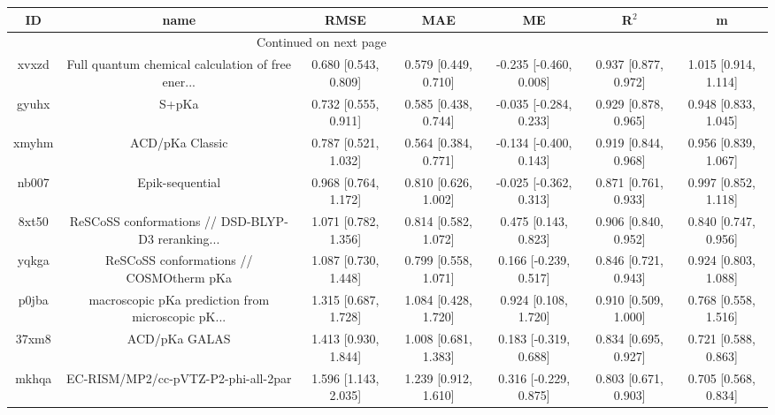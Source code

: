 \documentclass{article}
\begin{document}
\begin{center}
\begin{longtable}{|ccccccc|}
\toprule
    ID &                                               name &                  RMSE &                   MAE &                       ME &                 R$^2$ &                      m \\
\midrule
\endhead
\midrule
\multicolumn{3}{r}{{Continued on next page}} \\
\midrule
\endfoot

\bottomrule
\endlastfoot
 xvxzd &  Full quantum chemical calculation of free ener... &  0.680 [0.543, 0.809] &  0.579 [0.449, 0.710] &   -0.235 [-0.460, 0.008] &  0.937 [0.877, 0.972] &   1.015 [0.914, 1.114] \\
 gyuhx &                                              S+pKa &  0.732 [0.555, 0.911] &  0.585 [0.438, 0.744] &   -0.035 [-0.284, 0.233] &  0.929 [0.878, 0.965] &   0.948 [0.833, 1.045] \\
 xmyhm &                                    ACD/pKa Classic &  0.787 [0.521, 1.032] &  0.564 [0.384, 0.771] &   -0.134 [-0.400, 0.143] &  0.919 [0.844, 0.968] &   0.956 [0.839, 1.067] \\
 nb007 &                                    Epik-sequential &  0.968 [0.764, 1.172] &  0.810 [0.626, 1.002] &   -0.025 [-0.362, 0.313] &  0.871 [0.761, 0.933] &   0.997 [0.852, 1.118] \\
 8xt50 &  ReSCoSS conformations // DSD-BLYP-D3 reranking... &  1.071 [0.782, 1.356] &  0.814 [0.582, 1.072] &     0.475 [0.143, 0.823] &  0.906 [0.840, 0.952] &   0.840 [0.747, 0.956] \\
 yqkga &            ReSCoSS conformations // COSMOtherm pKa &  1.087 [0.730, 1.448] &  0.799 [0.558, 1.071] &    0.166 [-0.239, 0.517] &  0.846 [0.721, 0.943] &   0.924 [0.803, 1.088] \\
 p0jba &  macroscopic pKa prediction from microscopic pK... &  1.315 [0.687, 1.728] &  1.084 [0.428, 1.720] &     0.924 [0.108, 1.720] &  0.910 [0.509, 1.000] &   0.768 [0.558, 1.516] \\
 37xm8 &                                      ACD/pKa GALAS &  1.413 [0.930, 1.844] &  1.008 [0.681, 1.383] &    0.183 [-0.319, 0.688] &  0.834 [0.695, 0.927] &   0.721 [0.588, 0.863] \\
 mkhqa &                EC-RISM/MP2/cc-pVTZ-P2-phi-all-2par &  1.596 [1.143, 2.035] &  1.239 [0.912, 1.610] &    0.316 [-0.229, 0.875] &  0.803 [0.671, 0.903] &   0.705 [0.568, 0.834] \\

\end{longtable}
\end{center}
\end{document}
